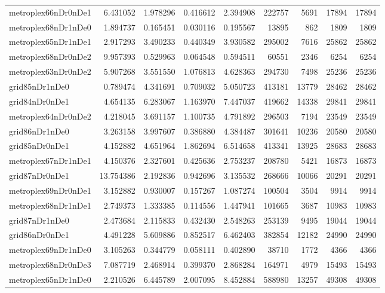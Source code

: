 \begin{longtable}{|l|r|r|r|r|r|r|r|r|}
metroplex66nDr0nDe1 & 6.431052 & 1.978296 & 0.416612 & 2.394908 & 222757 & 5691 & 17894 & 17894 \\
metroplex68nDr1nDe0 & 1.894737 & 0.165451 & 0.030116 & 0.195567 & 13895 & 862 & 1809 & 1809 \\
metroplex65nDr1nDe1 & 2.917293 & 3.490233 & 0.440349 & 3.930582 & 295002 & 7616 & 25862 & 25862 \\
metroplex68nDr0nDe2 & 9.957393 & 0.529963 & 0.064548 & 0.594511 & 60551 & 2346 & 6254 & 6254 \\
metroplex63nDr0nDe2 & 5.907268 & 3.551550 & 1.076813 & 4.628363 & 294730 & 7498 & 25236 & 25236 \\
grid85nDr1nDe0 & 0.789474 & 4.341691 & 0.709032 & 5.050723 & 413181 & 13779 & 28462 & 28462 \\
grid84nDr0nDe1 & 4.654135 & 6.283067 & 1.163970 & 7.447037 & 419662 & 14338 & 29841 & 29841 \\
metroplex64nDr0nDe2 & 4.218045 & 3.691157 & 1.100735 & 4.791892 & 296503 & 7194 & 23549 & 23549 \\
grid86nDr1nDe0 & 3.263158 & 3.997607 & 0.386880 & 4.384487 & 301641 & 10236 & 20580 & 20580 \\
grid85nDr0nDe1 & 4.152882 & 4.651964 & 1.862694 & 6.514658 & 413341 & 13925 & 28683 & 28683 \\
metroplex67nDr1nDe1 & 4.150376 & 2.327601 & 0.425636 & 2.753237 & 208780 & 5421 & 16873 & 16873 \\
grid87nDr0nDe1 & 13.754386 & 2.192836 & 0.942696 & 3.135532 & 268666 & 10066 & 20291 & 20291 \\
metroplex69nDr0nDe1 & 3.152882 & 0.930007 & 0.157267 & 1.087274 & 100504 & 3504 & 9914 & 9914 \\
metroplex68nDr1nDe1 & 2.749373 & 1.333385 & 0.114556 & 1.447941 & 101665 & 3687 & 10983 & 10983 \\
grid87nDr1nDe0 & 2.473684 & 2.115833 & 0.432430 & 2.548263 & 253139 & 9495 & 19044 & 19044 \\
grid86nDr0nDe1 & 4.491228 & 5.609886 & 0.852517 & 6.462403 & 382854 & 12182 & 24990 & 24990 \\
metroplex69nDr1nDe0 & 3.105263 & 0.344779 & 0.058111 & 0.402890 & 38710 & 1772 & 4366 & 4366 \\
metroplex68nDr0nDe3 & 7.087719 & 2.468914 & 0.399370 & 2.868284 & 164971 & 4979 & 15493 & 15493 \\
metroplex65nDr1nDe0 & 2.210526 & 6.445789 & 2.007095 & 8.452884 & 588980 & 13257 & 49308 & 49308 \\

\end{longtable}
